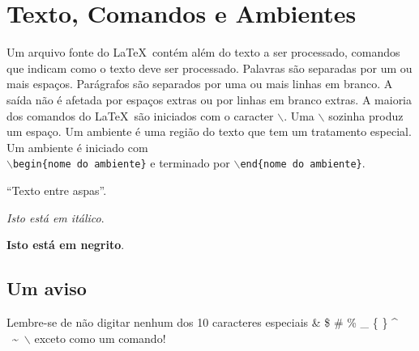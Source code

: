 \documentclass[a4paper,12pt]{article}%
\begin{document}

\section{Texto, Comandos e Ambientes} %

Um arquivo fonte do \LaTeX\ contém além do texto a ser processado,
comandos que indicam como o texto deve ser processado. Palavras
são separadas por um ou mais espaços. Parágrafos são separados por
uma ou mais linhas em branco. A saída não é afetada por espaços
extras ou por linhas em branco extras. A maioria dos comandos do
\LaTeX \ são iniciados com o caracter $\backslash$. Uma
$\backslash$ sozinha produz um espaço. Um ambiente é uma região do
texto
que tem um tratamento especial. Um ambiente é iniciado com\\
\texttt{$\backslash$begin\{nome do ambiente\}} e terminado por
\texttt{$\backslash$end\{nome do ambiente\}}.

``Texto entre aspas''.

\textit{Isto está em itálico}.

\textbf{Isto está em negrito}.

\subsection{Um aviso}  %

Lembre-se de não digitar nenhum dos 10 caracteres especiais
\& \$ \# \% \_ \{ \} \^{} \ \~{}\ $\backslash$ exceto como um
comando!
\end{document}
